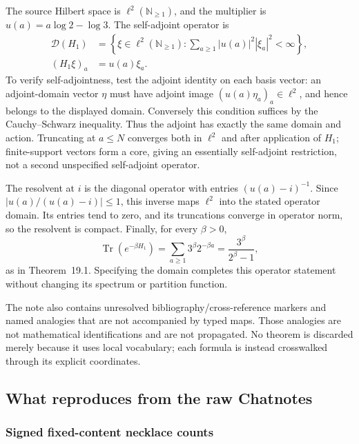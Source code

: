 \begin{sourceissue}
\label{issue:affine-H1-domain}
The source Hilbert space is $\ell^2(\mathbb N_{\ge1})$, and the multiplier
is $u(a)=a\log2-\log3$.  The self-adjoint operator is
\[
 \begin{split}
 \mathcal D(H_1)&=\left\{\xi\in\ell^2(\mathbb N_{\ge1}):
       \sum_{a\ge1}|u(a)|^2|\xi_a|^2<\infty\right\},\\
 (H_1\xi)_a&=u(a)\xi_a.
 \end{split}
\]
To verify self-adjointness, test the adjoint identity on each basis vector:
an adjoint-domain vector $\eta$ must have adjoint image
$(u(a)\eta_a)_a\in\ell^2$, and hence belongs to the displayed domain.
Conversely this condition suffices by the Cauchy--Schwarz inequality.
Thus the adjoint has exactly the same domain and action.  Truncating at
$a\le N$ converges both in $\ell^2$ and after application of $H_1$;
finite-support vectors form a core, giving an essentially self-adjoint
restriction, not a second unspecified self-adjoint operator.

The resolvent at $i$ is the diagonal operator with entries
$(u(a)-i)^{-1}$.  Since $|u(a)/(u(a)-i)|\le1$, this inverse maps
$\ell^2$ into the stated operator domain.  Its entries tend to zero, and
its truncations converge in operator
norm, so the resolvent is compact.  Finally, for every $\beta>0$,
\[
 \operatorname{Tr}(e^{-\beta H_1})
 =\sum_{a\ge1}3^\beta2^{-\beta a}
 =\frac{3^\beta}{2^\beta-1},
\]
as in Theorem~19.1.  Specifying the domain completes this operator statement
without changing its spectrum or partition function.
\end{sourceissue}

The note also contains unresolved bibliography/cross-reference markers and
named analogies that are not accompanied by typed maps.  Those analogies are
not mathematical identifications and are not propagated.  No theorem is
discarded merely because it uses local vocabulary; each formula is instead
crosswalked through its explicit coordinates.

\subsection{What reproduces from the raw Chatnotes}

\subsubsection{Signed fixed-content necklace counts}

